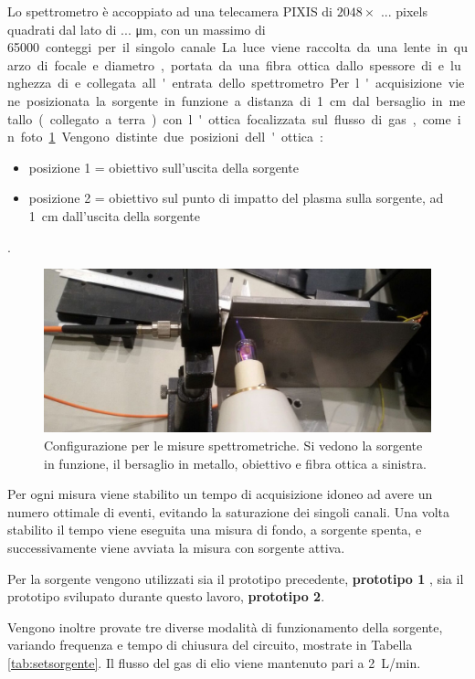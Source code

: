 Lo spettrometro è accoppiato ad una telecamera PIXIS di $2048 \times $ ... pixels quadrati dal lato di ... \si{\micro\meter}, con un massimo di \SI{65000} conteggi per il singolo canale.
La luce viene raccolta da una lente in quarzo di focale ... e diametro ... , portata da una fibra ottica dallo spessore di ... e lunghezza di ... e collegata all'entrata dello spettrometro.

Per l'acquisizione viene posizionata la sorgente in funzione a distanza di \SI{1}{\centi\metre} dal bersaglio in metallo (collegato a terra) con l'ottica focalizzata sul flusso di gas, come in foto \ref{fig:app}. Vengono distinte due posizioni dell'ottica:
\begin{itemize}
 \item posizione 1 = obiettivo sull'uscita della sorgente
 \item posizione 2 = obiettivo sul punto di impatto del plasma sulla sorgente, ad \SI{1}{\centi\meter} dall'uscita della sorgente
\end{itemize}
.

\begin{figure}
\centering
\includegraphics[width=.6\textwidth]{Immagini/apparato.jpg}
\caption{Configurazione per le misure spettrometriche. Si vedono la sorgente in funzione, il bersaglio in metallo, obiettivo e fibra ottica a sinistra.}
\label{fig:app}
\end{figure}

Per ogni misura viene stabilito un tempo di acquisizione idoneo ad avere un numero ottimale di eventi, evitando la saturazione dei singoli canali. Una volta stabilito il tempo viene eseguita una misura di fondo, a sorgente spenta, e successivamente viene avviata la misura con sorgente attiva.

Per la sorgente vengono utilizzati sia il prototipo precedente, \textbf{prototipo 1} , sia il prototipo svilupato durante questo lavoro, \textbf{prototipo 2}.

Vengono inoltre provate tre diverse modalità di funzionamento della sorgente, variando frequenza e tempo di chiusura del circuito, mostrate in Tabella \ref{tab:setsorgente}.
Il flusso del gas di elio viene mantenuto pari a \SI{2}{\liter/\minute}.

